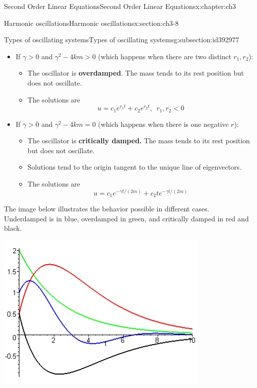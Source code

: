 \documentclass[oneside,10pt,]{book}
\newcommand{\terminology}[1]{\textbf{#1}}
\numberwithin{equation}{section}
\numberwithin{equation}{section}
\newcommand{\lt}{<}
\begin{document}
\begin{chapterptx}{Second Order Linear Equations}{}{Second Order Linear Equations}{}{}{x:chapter:ch3}
\begin{sectionptx}{Harmonic oscillations}{}{Harmonic oscillations}{}{}{x:section:ch3-8}
\begin{subsectionptx}{Types of oscillating systems}{}{Types of oscillating systems}{}{}{g:subsection:id392977}
\begin{itemize}[label=\textbullet]
\begin{itemize}[label=$\circ$]
\begin{image}{0.15}{0.7}{0.15}
\end{image}%
%
\end{itemize}
%
\item{}If \(\gamma>0\) and \(\gamma^{2}-4km>0\) (which happens when there are two distinct \(r_{1},r_{2}\)):%
\begin{itemize}[label=$\circ$]
\item{}The oscillator is \terminology{overdamped}. The mass tends to its rest position but does not oscillate.%
\item{}The solutions are%
\begin{equation*}
u=c_{1}e^{r_{1}t}+c_{2}e^{r_{2}t},\,\,\,r_{1},r_{2}\lt0
\end{equation*}
%
\end{itemize}
%
\item{}If \(\gamma>0\) and \(\gamma^{2}-4km=0\) (which happens when there is one negative \(r\)):%
\begin{itemize}[label=$\circ$]
\item{}The oscillator is \terminology{critically damped.} The mass tends to its rest position but does not oscillate.%
\item{}Solutions tend to the origin tangent to the unique line of eigenvectors.%
\item{}The solutions are%
\begin{equation*}
u=c_{1}e^{-\gamma t/(2m)}+c_{2}te^{-\gamma t/(2m)}
\end{equation*}
%
\end{itemize}
%
\end{itemize}
The image below illustrates the behavior possible in different cases. Underdamped is in blue, overdamped in green, and critically damped in red and black.%
\begin{image}{0}{1}{0}%
\includegraphics[width=\linewidth]{images/Spring6.jpg}

\end{image}
\end{subsectionptx}
\end{sectionptx}
\end{chapterptx}
\end{document}
